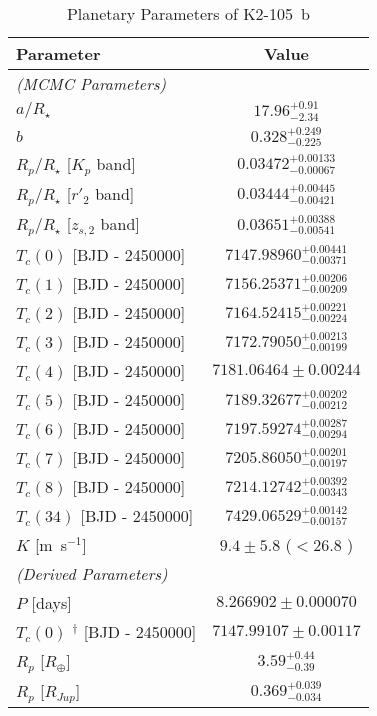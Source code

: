 \documentclass[]{pasj01}
\begin{document}
\begin{table}[tb]
\caption{Planetary Parameters of K2-105~b}\label{planettable}
\begin{tabular}{lc}
\hline
Parameter & Value \\\hline
{\it (MCMC Parameters)} & \\
$a/R_\star$ & $17.96_{-2.34}^{+0.91}$ \\
$b$ & $0.328_{-0.225}^{+0.249}$ \\
$R_p/R_\star$ [$K_p$ band]     & $0.03472_{-0.00067}^{+0.00133}$ \\
$R_p/R_\star$ [$r'_2$ band]      & $0.03444_{-0.00421}^{+0.00445}$ \\
$R_p/R_\star$ [$z_{s,2}$ band] & $0.03651_{-0.00541}^{+0.00388}$ \\
$T_{c} (0)$ [BJD - 2450000] & $ 7147.98960_{-0.00371}^{+0.00441} $\\
$T_{c} (1)$ [BJD - 2450000] & $ 7156.25371_{-0.00209}^{+0.00206} $\\
$T_{c} (2)$ [BJD - 2450000] & $ 7164.52415_{-0.00224}^{+0.00221} $\\
$T_{c} (3)$ [BJD - 2450000] & $ 7172.79050_{-0.00199}^{+0.00213} $\\
$T_{c} (4)$ [BJD - 2450000] & $ 7181.06464\pm0.00244 $\\
$T_{c} (5)$ [BJD - 2450000] & $ 7189.32677_{-0.00212}^{+0.00202} $\\
$T_{c} (6)$ [BJD - 2450000] & $ 7197.59274_{-0.00294}^{+0.00287} $\\
$T_{c} (7)$ [BJD - 2450000] & $ 7205.86050_{-0.00197}^{+0.00201} $\\
$T_{c} (8)$ [BJD - 2450000] & $ 7214.12742_{-0.00343}^{+0.00392} $\\
$T_{c} (34)$ [BJD - 2450000] & $ 7429.06529_{-0.00157}^{+0.00142}$\\
$K$ [m~s$^{-1}$] & $9.4 \pm 5.8$ ($<$26.8 \footnotemark[$*$])\\
\hline
{\it (Derived Parameters)} & \\
$P$ [days] & $8.266902 \pm 0.000070$ \\
$T_{c} (0)$ $^{\dagger}$ [BJD - 2450000] & $ 7147.99107\pm0.00117 $\\
$R_p$ [$R_{\oplus}$] \footnotemark[$\dagger$] & $ 3.59_{-0.39}^{+0.44} $ \\
$R_p$ [$R_{Jup}$] \footnotemark[$\ddagger$] & $0.369_{-0.034}^{+0.039} $ \\

\end{tabular}
\end{table}
\end{document}
